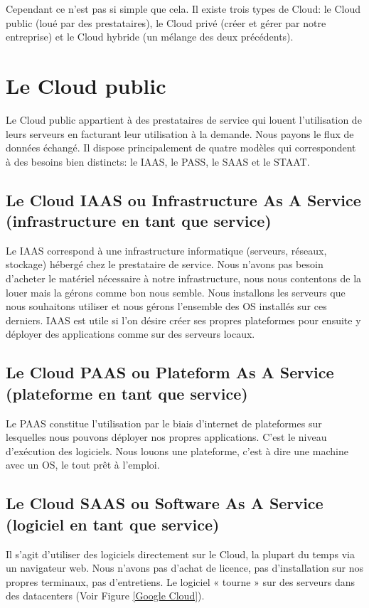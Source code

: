   Cependant ce n’est pas si simple que cela. Il existe trois types de Cloud: le Cloud public (loué par des prestataires), le Cloud privé (créer et gérer par notre entreprise) et le Cloud hybride (un mélange des deux précédents).

  \section{Le Cloud public}
  Le Cloud public appartient à des prestataires de service qui louent l’utilisation de leurs serveurs en facturant leur utilisation à la demande. Nous payons le flux de données échangé. Il dispose principalement de quatre modèles qui correspondent à des besoins bien distincts: le IAAS, le PASS, le SAAS et le STAAT.

    \subsection{Le Cloud IAAS ou Infrastructure As A Service (infrastructure en tant que service)}
    Le IAAS correspond à une infrastructure informatique (serveurs, réseaux, stockage) hébergé chez le prestataire de service. Nous n’avons pas besoin d’acheter le matériel nécessaire à notre infrastructure, nous nous contentons de la louer mais la gérons comme bon nous semble. Nous installons les serveurs que nous souhaitons utiliser et nous gérons l’ensemble des OS installés sur ces derniers. IAAS est utile si l’on désire créer ses propres plateformes pour ensuite y déployer des applications comme sur des serveurs locaux.

    \subsection{Le Cloud PAAS ou Plateform As A Service (plateforme en tant que service)}
    Le PAAS constitue l’utilisation par le biais d’internet de plateformes sur lesquelles nous pouvons déployer nos propres applications. C’est le niveau d’exécution des logiciels. Nous louons une plateforme, c’est à dire une machine avec un OS, le tout prêt à l’emploi.

    \subsection{Le Cloud SAAS ou Software As A Service (logiciel en tant que service)}
    Il s’agit d’utiliser des logiciels directement sur le Cloud, la plupart du temps via un navigateur web. Nous n’avons pas d’achat de licence, pas d’installation sur nos propres terminaux, pas d’entretiens. Le logiciel « tourne » sur des serveurs dans des datacenters (Voir Figure \ref{Google Cloud}).

